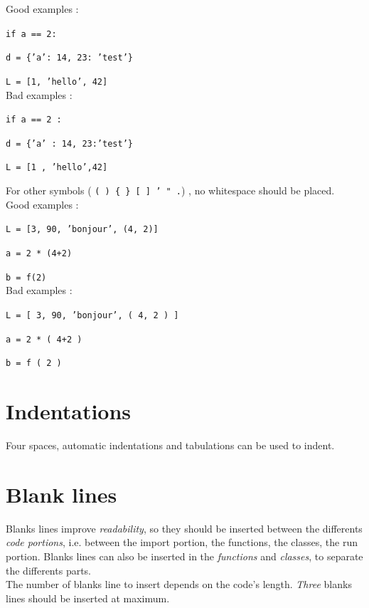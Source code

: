 \documentclass[a4paper,10pt]{report}
\begin{document}
   \noindent Good examples :
   
   \texttt{if a == 2:}
   
   \indent \indent \texttt{d = \{'a': 14, 23: 'test'\}}
   
   \indent \indent \texttt{L = [1, 'hello', 42]} \\
   
   
   \noindent Bad examples :
   
   \texttt{if a == 2 :}
   
   \indent \indent \texttt{d = \{'a' : 14, 23:'test'\}}
   
   \indent \indent \texttt{L = [1 , 'hello',42]} \newline \newline
   
   
   \noindent For other symbols ( \texttt{( ) \{ \} [ ] ' " .})  , no whitespace should be placed. \\
   
   \noindent Good examples :
   
   \texttt{L = [3, 90, 'bonjour', (4, 2)]}
   
   \texttt{a = 2 * (4+2)}
   
   \texttt{b = f(2)} \\
   
   
   \noindent Bad examples :
   
   \texttt{L = [ 3, 90, 'bonjour', ( 4, 2 ) ]}
   
   \texttt{a = 2 * ( 4+2 )}
   
   \texttt{b = f ( 2 )}
  
  
  
  \section{Indentations}
   Four spaces, automatic indentations and tabulations can be used to indent.
  
  \section{Blank lines}
   Blanks lines improve \emph{readability}, so they should be inserted between the differents \emph{code portions}, i.e. between the import portion, the functions, the classes, the run portion. Blanks lines can also be inserted in the \emph{functions} and \emph{classes}, to separate the differents parts. \\
   
   The number of blanks line to insert depends on the code's length. \emph{Three} blanks lines should be inserted at maximum. \\
   
\end{document}
